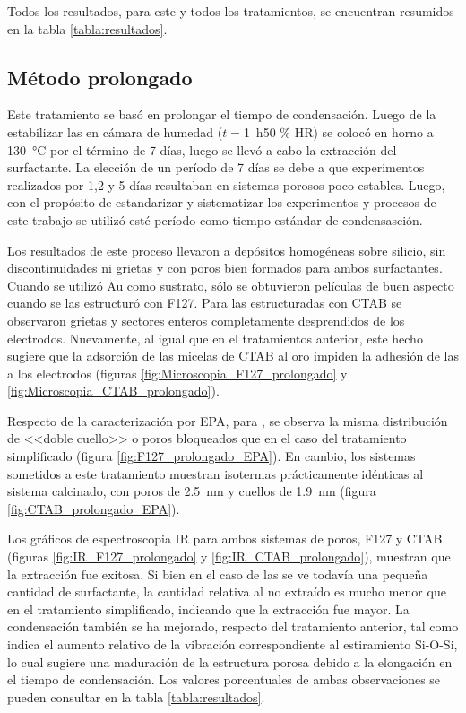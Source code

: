 			 Todos los resultados, para este y todos los tratamientos, se encuentran resumidos en la tabla \ref{tabla:resultados}.

	 \subsection{Método prolongado}

	 	 Este tratamiento se basó en prolongar el tiempo de condensación. Luego de la estabilizar las \pdm\space en cámara de humedad ($t=$\SI{1}{\hour}50 \% HR) se colocó en horno a \SI{130}{\celsius} por el término de 7 días, luego se llevó a cabo la extracción del surfactante. La elección de un período de 7 días se debe a que experimentos realizados por 1,2 y 5 días resultaban en sistemas porosos poco estables. Luego, con el propósito de estandarizar y sistematizar los experimentos y procesos de este trabajo se utilizó esté período como tiempo estándar de condensasción.

	 	 Los resultados de este proceso llevaron a depósitos homogéneas sobre silicio, sin discontinuidades ni grietas y con poros bien formados para ambos surfactantes. Cuando se utilizó Au como sustrato, sólo se obtuvieron películas de buen aspecto cuando se las estructuró con F127. Para las estructuradas con CTAB se observaron grietas y sectores enteros completamente desprendidos de los electrodos. Nuevamente, al igual que en el tratamientos anterior, este hecho sugiere que la adsorción de las micelas de CTAB al oro impiden la adhesión de las \pdmC\space a los electrodos (figuras \ref{fig:Microscopia_F127_prolongado} y \ref{fig:Microscopia_CTAB_prolongado}).

	 	 Respecto de la caracterización por EPA, para \pdmF, se observa la misma distribución de <<doble cuello>> o poros bloqueados que en el caso del tratamiento simplificado (figura \ref{fig:F127_prolongado_EPA}). En cambio, los sistemas \pdmC\space sometidos a este tratamiento muestran isotermas prácticamente idénticas al sistema calcinado, con poros de \SI{2,5}{\nm} y cuellos de \SI{1,9}{\nm} (figura \ref{fig:CTAB_prolongado_EPA}).

	 	 Los gráficos de espectroscopia IR para ambos sistemas de poros, F127 y CTAB (figuras \ref{fig:IR_F127_prolongado} y \ref{fig:IR_CTAB_prolongado}), muestran que la extracción fue exitosa. Si bien en el caso de las \pdmC\space se ve todavía una pequeña cantidad de surfactante, la cantidad relativa al no extraído es mucho menor que en el tratamiento simplificado, indicando que la extracción fue mayor. La condensación también se ha mejorado, respecto del tratamiento anterior, tal como indica el aumento relativo de la vibración correspondiente al estiramiento Si-O-Si, lo cual sugiere una maduración de la estructura porosa debido a la elongación en el tiempo de condensación. Los valores porcentuales de ambas observaciones se pueden consultar en la tabla \ref{tabla:resultados}.


